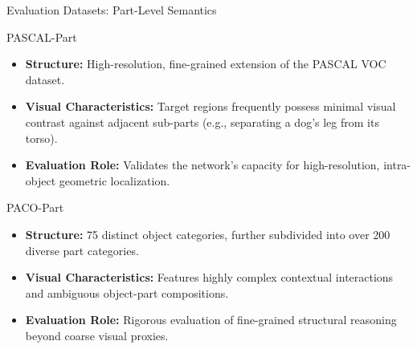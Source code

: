 \documentclass[aspectratio=169, 10pt]{beamer}
\begin{document}
\begin{frame}{Evaluation Datasets: Part-Level Semantics}
    \begin{block}{PASCAL-Part \cite{chen2014detect}}
        \begin{itemize}
            \item \textbf{Structure:} High-resolution, fine-grained extension of the PASCAL VOC dataset.
            \item \textbf{Visual Characteristics:} Target regions frequently possess minimal visual contrast against adjacent sub-parts (e.g., separating a dog's leg from its torso).
            \item \textbf{Evaluation Role:} Validates the network's capacity for high-resolution, intra-object geometric localization.
        \end{itemize}
    \end{block}

    \begin{block}{PACO-Part \cite{ramanathan2023paco}}
        \begin{itemize}
            \item \textbf{Structure:} 75 distinct object categories, further subdivided into over 200 diverse part categories.
            \item \textbf{Visual Characteristics:} Features highly complex contextual interactions and ambiguous object-part compositions.
            \item \textbf{Evaluation Role:} Rigorous evaluation of fine-grained structural reasoning beyond coarse visual proxies.
        \end{itemize}
    \end{block}
\end{frame}
\end{document}

